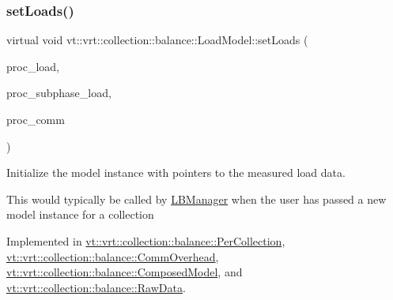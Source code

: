 \subsubsection{\texorpdfstring{set\+Loads()}{setLoads()}}
{\footnotesize\ttfamily virtual void vt\+::vrt\+::collection\+::balance\+::\+Load\+Model\+::set\+Loads (\begin{DoxyParamCaption}\item[{std\+::vector$<$ \hyperlink{namespacevt_1_1vrt_1_1collection_1_1balance_a45306ee4bf38fe3fb586d1ee2fa3d147}{Load\+Map\+Type} $>$ const $\ast$}]{proc\+\_\+load,  }\item[{std\+::vector$<$ \hyperlink{namespacevt_1_1vrt_1_1collection_1_1balance_a3d91523158c1025b7b665240072f3b7e}{Subphase\+Load\+Map\+Type} $>$ const $\ast$}]{proc\+\_\+subphase\+\_\+load,  }\item[{std\+::vector$<$ \hyperlink{namespacevt_1_1vrt_1_1collection_1_1balance_a10860c956804d644db54a16012352728}{Comm\+Map\+Type} $>$ const $\ast$}]{proc\+\_\+comm }\end{DoxyParamCaption})\hspace{0.3cm}{\ttfamily [pure virtual]}}



Initialize the model instance with pointers to the measured load data. 

This would typically be called by \hyperlink{structvt_1_1vrt_1_1collection_1_1balance_1_1_l_b_manager}{L\+B\+Manager} when the user has passed a new model instance for a collection 

Implemented in \hyperlink{structvt_1_1vrt_1_1collection_1_1balance_1_1_per_collection_a3bb3d9cfd738fa4db83399e28a2bd2f2}{vt\+::vrt\+::collection\+::balance\+::\+Per\+Collection}, \hyperlink{structvt_1_1vrt_1_1collection_1_1balance_1_1_comm_overhead_a8c62ec3e2f2b408d6c59ec02d49daa52}{vt\+::vrt\+::collection\+::balance\+::\+Comm\+Overhead}, \hyperlink{classvt_1_1vrt_1_1collection_1_1balance_1_1_composed_model_af39d608580ad1512d11a45234c85e987}{vt\+::vrt\+::collection\+::balance\+::\+Composed\+Model}, and \hyperlink{structvt_1_1vrt_1_1collection_1_1balance_1_1_raw_data_aa2765863c7789775e140e55ffeb2620c}{vt\+::vrt\+::collection\+::balance\+::\+Raw\+Data}.

\mbox{\label{classvt_1_1vrt_1_1collection_1_1balance_1_1_load_model_a4f1c6fb5d7d7a0b147755f025b1d5f5c}} 
